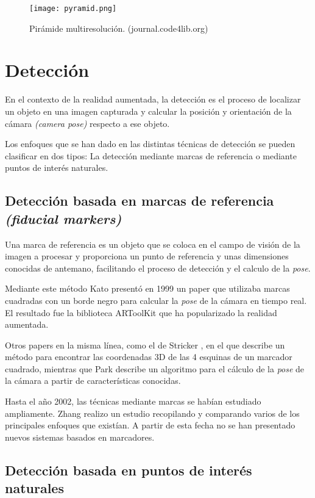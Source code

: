 \begin{figure}
  \centering
  \texttt{[image: pyramid.png]}
  \caption{Pirámide multiresolución. (journal.code4lib.org)}
  \label{fig:pirescale}
\end{figure}

\section{Detección}
En el contexto de la realidad aumentada, la detección es el proceso de localizar un objeto en una imagen capturada y calcular la posición y orientación de la cámara \emph{(camera pose)} respecto a ese objeto.

Los enfoques que se han dado en las distintas técnicas de detección se pueden clasificar en dos tipos: La detección mediante marcas de referencia o mediante puntos de interés naturales.

\subsection{Detección basada en marcas de referencia \emph{(fiducial markers)}}
Una marca de referencia es un objeto que se coloca en el campo de visión de la imagen a procesar y proporciona un punto de referencia y unas dimensiones conocidas de antemano, facilitando el proceso de detección y el calculo de la \textit{pose}.

Mediante este método Kato presentó en 1999 un paper que utilizaba marcas cuadradas con un borde negro para calcular la \textit{pose} de la cámara en tiempo real\cite{Kato}. El resultado fue la biblioteca ARToolKit que ha popularizado la realidad aumentada.

Otros papers en la misma línea, como el de Stricker \cite{Stricker}, en el que describe un método para encontrar las coordenadas 3D de las 4 esquinas de un marcador cuadrado, mientras que Park \cite{Park2} describe un algoritmo para el cálculo de la \textit{pose} de la cámara a partir de características conocidas.

Hasta el año 2002, las técnicas mediante marcas se habían estudiado ampliamente. Zhang \cite{Zhang} realizo un estudio recopilando y comparando varios de los principales enfoques que existían. A partir de esta fecha no se han presentado nuevos sistemas basados en marcadores.

\subsection{Detección basada en puntos de interés naturales}

